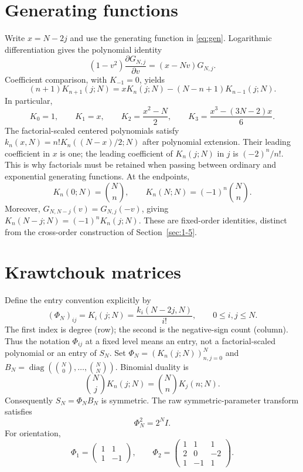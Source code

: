 \section{Generating functions}
\label{sec:1-3}
Write $x=N-2j$ and use the generating function in \eqref{eq:gen}. Logarithmic differentiation gives the polynomial identity
\[
(1-v^2)\frac{\partial G_{N,j}}{\partial v}=(x-Nv)G_{N,j}.
\]
Coefficient comparison, with $K_{-1}=0$, yields
\[
(n+1)K_{n+1}(j;N)=xK_n(j;N)-(N-n+1)K_{n-1}(j;N).
\]
In particular,
\[
K_0=1,\qquad K_1=x,\qquad K_2=\frac{x^2-N}{2},\qquad
K_3=\frac{x^3-(3N-2)x}{6}.
\]
The factorial-scaled centered polynomials satisfy $k_n(x,N)=n!K_n((N-x)/2;N)$ after polynomial extension. Their leading coefficient in $x$ is one; the leading coefficient of $K_n(j;N)$ in $j$ is $(-2)^n/n!$. This is why factorials must be retained when passing between ordinary and exponential generating functions.
At the endpoints,
\[
K_n(0;N)=\binom Nn,\qquad K_n(N;N)=(-1)^n\binom Nn.
\]
Moreover, $G_{N,N-j}(v)=G_{N,j}(-v)$, giving $K_n(N-j;N)=(-1)^nK_n(j;N)$. These are fixed-order identities, distinct from the cross-order construction of Section~\ref{sec:1-5}.

\section{Krawtchouk matrices}
\label{sec:1-4}
Define the entry convention explicitly by
\[
(\Phi_N)_{ij}=K_i(j;N)=\frac{k_i(N-2j,N)}{i!},\qquad 0\le i,j\le N.
\]
The first index is degree (row); the second is the negative-sign
count (column). Thus the notation $\Phi_{ij}$ at a fixed level means
an entry, not a factorial-scaled polynomial or an entry of $S_N$.
Set $\Phi_N=(K_n(j;N))_{n,j=0}^N$ and
$B_N=\operatorname{diag}(\binom N0,\ldots,\binom NN)$. Binomial duality is
\[
\binom Nj K_n(j;N)=\binom Nn K_j(n;N).
\]
Consequently $S_N=\Phi_NB_N$ is symmetric. The raw symmetric-parameter transform satisfies
\[
\Phi_N^2=2^NI.
\]
For orientation,
\[
\Phi_1=\begin{pmatrix}1&1\\1&-1\end{pmatrix},\qquad
\Phi_2=\begin{pmatrix}1&1&1\\2&0&-2\\1&-1&1\end{pmatrix}.
\]

